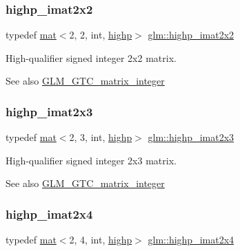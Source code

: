 \subsubsection{\texorpdfstring{highp\+\_\+imat2x2}{highp\_imat2x2}}
{\footnotesize\ttfamily typedef \mbox{\hyperlink{structglm_1_1mat}{mat}}$<$2, 2, int, \mbox{\hyperlink{namespaceglm_a36ed105b07c7746804d7fdc7cc90ff25ac6f7eab42eacbb10d59a58e95e362074}{highp}}$>$ \mbox{\hyperlink{group__gtc__matrix__integer_ga9d5c6c5a4640f7c794a77e3f60b91670}{glm\+::highp\+\_\+imat2x2}}}

High-\/qualifier signed integer 2x2 matrix. \begin{DoxySeeAlso}{See also}
\mbox{\hyperlink{group__gtc__matrix__integer}{G\+L\+M\+\_\+\+G\+T\+C\+\_\+matrix\+\_\+integer}} 
\end{DoxySeeAlso}
\mbox{\label{group__gtc__matrix__integer_ga6bf015d7d01115e1d71362f2aa1cd3c4}} 
\subsubsection{\texorpdfstring{highp\+\_\+imat2x3}{highp\_imat2x3}}
{\footnotesize\ttfamily typedef \mbox{\hyperlink{structglm_1_1mat}{mat}}$<$2, 3, int, \mbox{\hyperlink{namespaceglm_a36ed105b07c7746804d7fdc7cc90ff25ac6f7eab42eacbb10d59a58e95e362074}{highp}}$>$ \mbox{\hyperlink{group__gtc__matrix__integer_ga6bf015d7d01115e1d71362f2aa1cd3c4}{glm\+::highp\+\_\+imat2x3}}}

High-\/qualifier signed integer 2x3 matrix. \begin{DoxySeeAlso}{See also}
\mbox{\hyperlink{group__gtc__matrix__integer}{G\+L\+M\+\_\+\+G\+T\+C\+\_\+matrix\+\_\+integer}} 
\end{DoxySeeAlso}
\mbox{\label{group__gtc__matrix__integer_ga5e3a9d05895fbefef19c051e60ca81c4}} 
\subsubsection{\texorpdfstring{highp\+\_\+imat2x4}{highp\_imat2x4}}
{\footnotesize\ttfamily typedef \mbox{\hyperlink{structglm_1_1mat}{mat}}$<$2, 4, int, \mbox{\hyperlink{namespaceglm_a36ed105b07c7746804d7fdc7cc90ff25ac6f7eab42eacbb10d59a58e95e362074}{highp}}$>$ \mbox{\hyperlink{group__gtc__matrix__integer_ga5e3a9d05895fbefef19c051e60ca81c4}{glm\+::highp\+\_\+imat2x4}}}

